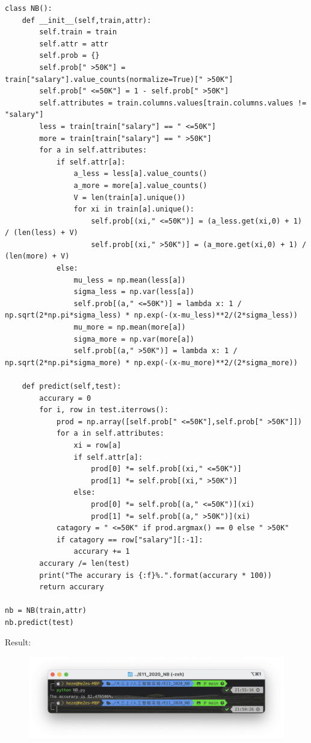 \documentclass[a4paper, 11pt]{article}
\begin{document}
\begin{lstlisting}
class NB():
    def __init__(self,train,attr):
        self.train = train
        self.attr = attr
        self.prob = {}
        self.prob[" >50K"] = train["salary"].value_counts(normalize=True)[" >50K"]
        self.prob[" <=50K"] = 1 - self.prob[" >50K"]
        self.attributes = train.columns.values[train.columns.values != "salary"]
        less = train[train["salary"] == " <=50K"]
        more = train[train["salary"] == " >50K"]
        for a in self.attributes:
            if self.attr[a]:
                a_less = less[a].value_counts()
                a_more = more[a].value_counts()
                V = len(train[a].unique())
                for xi in train[a].unique():
                    self.prob[(xi," <=50K")] = (a_less.get(xi,0) + 1) / (len(less) + V)
                    self.prob[(xi," >50K")] = (a_more.get(xi,0) + 1) / (len(more) + V)
            else:
                mu_less = np.mean(less[a])
                sigma_less = np.var(less[a])
                self.prob[(a," <=50K")] = lambda x: 1 / np.sqrt(2*np.pi*sigma_less) * np.exp(-(x-mu_less)**2/(2*sigma_less))
                mu_more = np.mean(more[a])
                sigma_more = np.var(more[a])
                self.prob[(a," >50K")] = lambda x: 1 / np.sqrt(2*np.pi*sigma_more) * np.exp(-(x-mu_more)**2/(2*sigma_more))
            
    def predict(self,test):
        accurary = 0
        for i, row in test.iterrows():
            prod = np.array([self.prob[" <=50K"],self.prob[" >50K"]])
            for a in self.attributes:
                xi = row[a]
                if self.attr[a]:
                    prod[0] *= self.prob[(xi," <=50K")]
                    prod[1] *= self.prob[(xi," >50K")]
                else: 
                    prod[0] *= self.prob[(a," <=50K")](xi)
                    prod[1] *= self.prob[(a," >50K")](xi)
            catagory = " <=50K" if prod.argmax() == 0 else " >50K"
            if catagory == row["salary"][:-1]:
                accurary += 1
        accurary /= len(test)
        print("The accurary is {:f}%.".format(accurary * 100))
        return accurary
    
nb = NB(train,attr)
nb.predict(test)
\end{lstlisting}

Result:
\begin{figure}[htb]
  \centering
  \includegraphics[width=1\textwidth]{1.png}
  \qquad
\end{figure}

%
%
\end{document}
